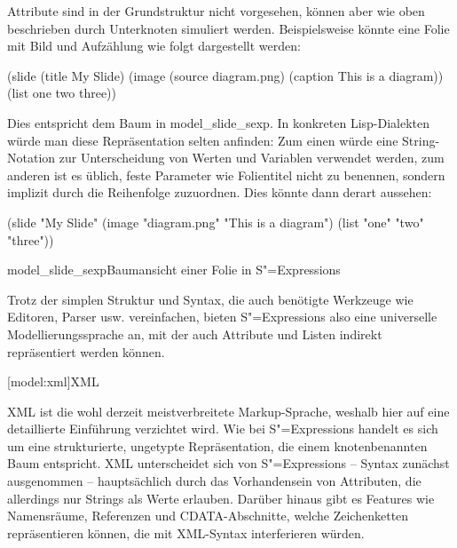 \documentclass[12pt, a4paper, bibgerm]{scrbook}
\newenvironment{DIFnomarkup}{}{}
\newcommand\lsection{}
\newcommand\abb{}
\newcommand\fig{}
\newcommand{\sexps}{S"=Expressions}
\begin{document}
Attribute sind in der Grundstruktur nicht vorgesehen, können aber wie
oben beschrieben durch Unterknoten simuliert werden. Beispielsweise
könnte eine Folie mit Bild und Aufzählung wie folgt dargestellt werden:
\begin{DIFnomarkup}\begin{code}
(slide 
  (title My Slide)
  (image
    (source diagram.png)
    (caption This is a diagram))
  (list one two three))
\end{code}\end{DIFnomarkup}
Dies entspricht dem Baum in \abb{model_slide_sexp}. In konkreten
Lisp-Dialekten würde man diese Repräsentation selten anfinden: Zum einen
würde eine String-Notation zur Unterscheidung von Werten und Variablen
verwendet werden, zum anderen ist es üblich, feste Parameter wie
Folientitel nicht zu benennen, sondern implizit durch die Reihenfolge
zuzuordnen. Dies könnte dann derart aussehen:
\begin{DIFnomarkup}\begin{code}
(slide "My Slide"
  (image "diagram.png" "This is a diagram")
  (list "one" "two" "three"))
\end{code}\end{DIFnomarkup}

\fig{model_slide_sexp}{Baumansicht einer Folie in \sexps{}}

Trotz der simplen Struktur und Syntax, die auch benötigte Werkzeuge wie
Editoren, Parser usw. vereinfachen, bieten \sexps{} also eine
universelle Modellierungssprache an, mit der auch Attribute und Listen
indirekt repräsentiert werden können.

\lsection[model:xml]{XML}

XML ist die wohl derzeit meistverbreitete Markup-Sprache, weshalb hier
auf eine detaillierte Einführung verzichtet wird. Wie bei \sexps{}
handelt es sich um eine strukturierte, ungetypte Repräsentation, die
einem knotenbenannten Baum entspricht. XML unterscheidet sich von
\sexps{} -- Syntax zunächst ausgenommen -- hauptsächlich durch das
Vorhandensein von Attributen, die allerdings nur Strings als Werte
erlauben. Darüber hinaus gibt es Features wie Namensräume, Referenzen
und CDATA-Abschnitte, welche Zeichenketten repräsentieren können, die
mit XML-Syntax interferieren würden.
\end{document}

